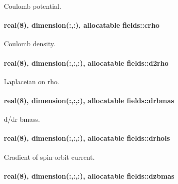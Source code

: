 Coulomb potential. 

\paragraph[{\texorpdfstring{crho}{crho}}]{\setlength{\rightskip}{0pt plus 5cm}real(8), dimension(\+:,\+:), allocatable fields\+::crho}\hypertarget{namespacefields_a0b0e5cd1c18125a1a550d87185558179}{}\label{namespacefields_a0b0e5cd1c18125a1a550d87185558179}


Coulomb density. 

\paragraph[{\texorpdfstring{d2rho}{d2rho}}]{\setlength{\rightskip}{0pt plus 5cm}real(8), dimension(\+:,\+:,\+:), allocatable fields\+::d2rho}\hypertarget{namespacefields_a5369b7cad87a8f7f4a8419064ff98f37}{}\label{namespacefields_a5369b7cad87a8f7f4a8419064ff98f37}


Laplaceian on {\ttfamily rho}. 

\paragraph[{\texorpdfstring{drbmas}{drbmas}}]{\setlength{\rightskip}{0pt plus 5cm}real(8), dimension(\+:,\+:,\+:), allocatable fields\+::drbmas}\hypertarget{namespacefields_a49978430f369b8966531d037726be271}{}\label{namespacefields_a49978430f369b8966531d037726be271}


d/dr {\ttfamily bmass}. 

\paragraph[{\texorpdfstring{drhols}{drhols}}]{\setlength{\rightskip}{0pt plus 5cm}real(8), dimension(\+:,\+:,\+:), allocatable fields\+::drhols}\hypertarget{namespacefields_a4bb216cb666e2cd3e39493ff2d9edc33}{}\label{namespacefields_a4bb216cb666e2cd3e39493ff2d9edc33}


Gradient of spin-\/orbit current. 

\paragraph[{\texorpdfstring{dzbmas}{dzbmas}}]{\setlength{\rightskip}{0pt plus 5cm}real(8), dimension(\+:,\+:,\+:), allocatable fields\+::dzbmas}\hypertarget{namespacefields_a08e266194feab00d01074a75a462054a}{}\label{namespacefields_a08e266194feab00d01074a75a462054a}


